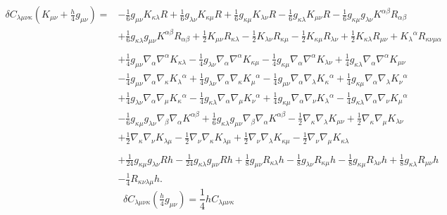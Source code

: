 \documentclass[10pt,letterpaper]{article}
\begin{document}
\begin{align}
\delta C_{\lambda\mu\nu\kappa}(K_{\mu\nu}+\tfrac{h}{4}g_{\mu\nu})={}&- \tfrac{1}{6} g_{\mu \nu} K_{\kappa \lambda} R
 + \tfrac{1}{6} g_{\lambda \nu} K_{\kappa \mu} R
 + \tfrac{1}{6} g_{\kappa \mu} K_{\lambda \nu} R
 -  \tfrac{1}{6} g_{\kappa \lambda} K_{\mu \nu} R
 -  \tfrac{1}{6} g_{\kappa \mu} g_{\lambda \nu} K^{\alpha \beta} R_{\alpha \beta}\nonumber\\
& + \tfrac{1}{6} g_{\kappa \lambda} g_{\mu \nu} K^{\alpha \beta} R_{\alpha \beta}
 + \tfrac{1}{2} K_{\mu \nu} R_{\kappa \lambda}
 -  \tfrac{1}{2} K_{\lambda \nu} R_{\kappa \mu}
 -  \tfrac{1}{2} K_{\kappa \mu} R_{\lambda \nu}
 + \tfrac{1}{2} K_{\kappa \lambda} R_{\mu \nu}
 + K_{\lambda}{}^{\alpha} R_{\kappa \nu \mu \alpha}\nonumber\\
\nonumber\\
&+\tfrac{1}{4} g_{\mu \nu} \nabla_{\alpha}\nabla^{\alpha}K_{\kappa \lambda}
 -  \tfrac{1}{4} g_{\lambda \nu} \nabla_{\alpha}\nabla^{\alpha}K_{\kappa \mu}
 -  \tfrac{1}{4} g_{\kappa \mu} \nabla_{\alpha}\nabla^{\alpha}K_{\lambda \nu}
 + \tfrac{1}{4} g_{\kappa \lambda} \nabla_{\alpha}\nabla^{\alpha}K_{\mu \nu}\nonumber\\
& -  \tfrac{1}{4} g_{\mu \nu} \nabla_{\alpha}\nabla_{\kappa}K_{\lambda}{}^{\alpha}
 + \tfrac{1}{4} g_{\lambda \nu} \nabla_{\alpha}\nabla_{\kappa}K_{\mu}{}^{\alpha}
 -  \tfrac{1}{4} g_{\mu \nu} \nabla_{\alpha}\nabla_{\lambda}K_{\kappa}{}^{\alpha}
 + \tfrac{1}{4} g_{\kappa \mu} \nabla_{\alpha}\nabla_{\lambda}K_{\nu}{}^{\alpha}\nonumber\\
& + \tfrac{1}{4} g_{\lambda \nu} \nabla_{\alpha}\nabla_{\mu}K_{\kappa}{}^{\alpha}
 -  \tfrac{1}{4} g_{\kappa \lambda} \nabla_{\alpha}\nabla_{\mu}K_{\nu}{}^{\alpha}
 + \tfrac{1}{4} g_{\kappa \mu} \nabla_{\alpha}\nabla_{\nu}K_{\lambda}{}^{\alpha}
 -  \tfrac{1}{4} g_{\kappa \lambda} \nabla_{\alpha}\nabla_{\nu}K_{\mu}{}^{\alpha}\nonumber\\
& -  \tfrac{1}{6} g_{\kappa \mu} g_{\lambda \nu} \nabla_{\beta}\nabla_{\alpha}K^{\alpha \beta}
 + \tfrac{1}{6} g_{\kappa \lambda} g_{\mu \nu} \nabla_{\beta}\nabla_{\alpha}K^{\alpha \beta}
 -  \tfrac{1}{2} \nabla_{\kappa}\nabla_{\lambda}K_{\mu \nu}
 + \tfrac{1}{2} \nabla_{\kappa}\nabla_{\mu}K_{\lambda \nu}\nonumber\\
& + \tfrac{1}{2} \nabla_{\kappa}\nabla_{\nu}K_{\lambda \mu}
 -  \tfrac{1}{2} \nabla_{\nu}\nabla_{\kappa}K_{\lambda \mu}
 + \tfrac{1}{2} \nabla_{\nu}\nabla_{\lambda}K_{\kappa \mu}
 -  \tfrac{1}{2} \nabla_{\nu}\nabla_{\mu}K_{\kappa \lambda}\nonumber\\
\nonumber\\
&+\tfrac{1}{24} g_{\kappa \mu} g_{\lambda \nu} R h
 -  \tfrac{1}{24} g_{\kappa \lambda} g_{\mu \nu} R h
 + \tfrac{1}{8} g_{\mu \nu} R_{\kappa \lambda} h
 -  \tfrac{1}{8} g_{\lambda \nu} R_{\kappa \mu} h
 -  \tfrac{1}{8} g_{\kappa \mu} R_{\lambda \nu} h
 + \tfrac{1}{8} g_{\kappa \lambda} R_{\mu \nu} h\nonumber\\
& -  \tfrac{1}{4} R_{\kappa \nu \lambda \mu} h.
\end{align}
\begin{equation}
\delta C_{\lambda\mu\nu\kappa}(\tfrac{h}{4}g_{\mu\nu}) = \frac14 h C_{\lambda\mu\nu\kappa}
\end{equation}
\end{document}

